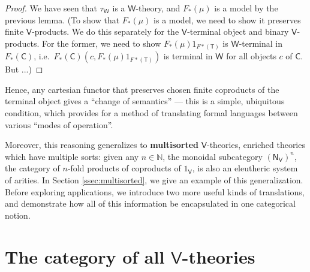\documentclass{amsart}
\theoremstyle{definition}
\newcommand{\NN}{\mathsf{N}}
\newcommand{\V}{\mathsf{V}}
\newcommand{\W}{\mathsf{W}}
\newcommand{\D}{\mathsf{D}}
\newcommand{\C}{\mathsf{C}}
\newcommand{\T}{\mathsf{T}}
\begin{document}
\begin{proof}
  We have seen that $\tau_\W$ is a $\W$-theory, and $F_*(\mu)$ is a model by the previous lemma.
  (To show that $F_*(\mu)$ is a model, we need
to show it preserves finite $\V$-products.   We do this separately for the $\V$-terminal object and
binary $\V$-products.  For the former, we need to show $F_*(\mu) 1_{F*(\T)}$ is $\W$-terminal
in $F_*(\C)$, i.e.\ $F_*(\C) (c, F_*(\mu) 1_{F*(\T)}) $ is terminal in $\W$ for all objects
$c$ of $\C$.  But ...)

\iffalse
	\[\begin{array}{rcll}
	F_*(\D)(F_*(f)(a),F_*(f)(s^{n_\V})) & = & F(\D(f(a),f(t^{n_\V})) & \text{definition of base change}\\
	& \cong & F(\D(f(a),f(t)^{n_\V}) & f \text{ preserves } \NN_\V \text{-powers}\\
	& \cong & F(\D(f(a),f(t))^n) & \text{Lemma \ref{lem:powers_1} for } \V\\
	& \cong & F(\D(f(a),f(t)))^n & F \text{preserves $\V$-products}\\
	& = & F_*(\D)(f(a),f(t))^n & \text{definition of base change}\\
	& \cong & F_*(\D)(f(a),f(t)^{n_\W}) & \text{Lemma \ref{lem:powers_1} for } \W. \qedhere
	\end{array}\]
\fi
\end{proof}

Hence, any cartesian functor that preserves chosen finite coproducts of the terminal object gives a ``change of semantics'' --- this is a simple, ubiquitous condition, which provides for a method of translating formal languages between various ``modes of operation''.

Moreover, this reasoning generalizes to \textbf{multisorted} $\V$-theories, enriched theories which have multiple sorts: given any $n\in \mathbb{N}$, the monoidal subcategory $(\NN_\V)^n$, the category of $n$-fold products of coproducts of $1_\V$, is also an eleutheric system of arities.   In Section \ref{ssec:multisorted}, we give an example of this generalization.\\

Before exploring applications, we introduce two more useful kinds of translations, and demonstrate how all of this information be encapsulated in one categorical notion.

\section{The category of all $\V$-theories}
\end{document}
